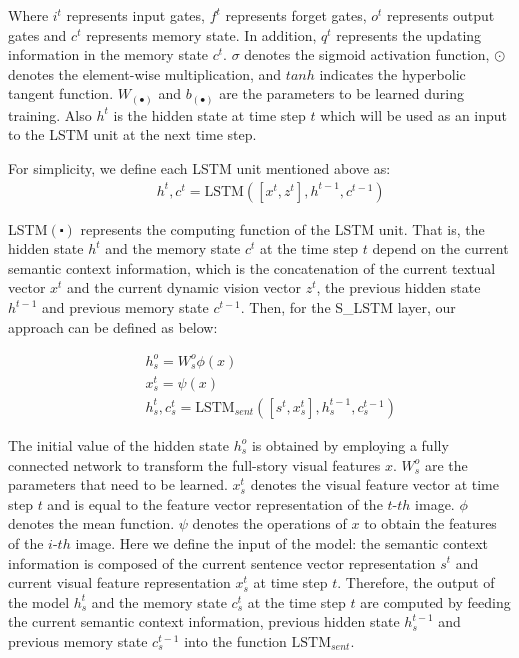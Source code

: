 \documentclass[a4paper,fleqn]{cas-sc}
\begin{document}
Where $i^t$ represents input gates, $f^t$ represents forget gates, $o^t$ represents output gates and $c^t$ represents memory state. In addition, $q^t$ represents the updating information in the memory state $c^t$. $\sigma$ denotes the sigmoid activation function, $\odot$ denotes the element-wise multiplication, and $\mathit{tanh}$ indicates the hyperbolic tangent function. $W_{(\bullet)}$ and $b_{(\bullet)}$ are the parameters to be learned during training. Also $h^t$ is the hidden state at time step $t$ which will be used as an input to the LSTM unit at the next time step.

For simplicity, we define each LSTM unit mentioned above as:
 \begin{eqnarray} \label{eq:lstm}
&& h^t, c^t = \text{LSTM}([x^t,z^t], h^{t-1}, c^{t-1}) 
 \end{eqnarray}
 
LSTM$(\centerdot)$ represents the computing function of the LSTM unit. That is, the hidden state $h^t$ and the memory state $c^t$ at the time step $t$  depend on the current semantic context information, which is the concatenation of the current textual vector $x^t$ and the current dynamic vision vector $z^t$, the previous hidden state $h^{t-1}$ and previous memory state $c^{t-1}$. Then, for the S\_LSTM layer, our approach can be defined as below:

\begin{eqnarray}
&&h^o_s =W^o_s \phi(x) \nonumber\\
&&x^t_s = \psi(x) \nonumber\\
&&h^t_s, c^t_s = {\text{LSTM}_{sent}}([s^t,x^t_s], h^{t-1}_s, c^{t-1}_s) 
\end{eqnarray}

The initial value of the hidden state $h^o_s$ is obtained by employing a fully connected network to transform the full-story visual features $x$. $W^o_s$ are the parameters that need to be learned. $x^t_s$ denotes the visual feature vector at time step $t$ and is equal to the feature vector representation of the $t$-${th}$ image. 
$\phi$ denotes the mean function. $\psi$ denotes the operations of $x$ to obtain the features of the $i$-${th}$ image.
Here we define the input of the model: the semantic context information is composed of the current sentence vector representation $s^t$ and current visual feature representation $x^t_s$ at time step $t$. Therefore, the output of the model $h^t_s$ and the memory state $c^t_s$ at the time step $t$ are computed by feeding the current semantic context information, previous hidden state $h^{t-1}_s$ and previous memory state $ c^{t-1}_s $ into the function $\text{LSTM}_{sent}$.
\end{document}
